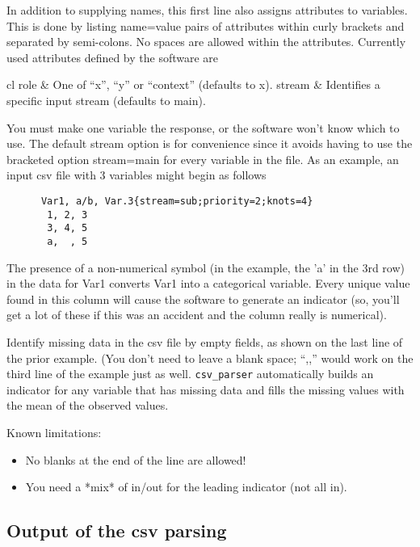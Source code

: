 \documentclass[12pt]{article}
\begin{document}
 In addition to supplying names, this first line also assigns attributes to
 variables.  This is done by listing name=value pairs of attributes within
 curly brackets and separated by semi-colons.  No spaces are allowed within the
 attributes.  Currently used attributes defined by the software are

 \begin{tabular}{cl}
   role   &  One of ``x'', ``y'' or ``context'' (defaults to x).     \cr
   stream &  Identifies a specific input stream  (defaults to main). \cr
 \end{tabular}

 \noindent
 You must make one variable the response, or the software won't know which to
 use.  The default stream option is for convenience since it avoids having to
 use the bracketed option {stream=main} for every variable in the file.
 As an example, an input csv file with 3 variables might begin as follows
 \begin{verbatim}
      Var1, a/b, Var.3{stream=sub;priority=2;knots=4}
       1, 2, 3
       3, 4, 5
       a,  , 5
 \end{verbatim}
 The presence of a non-numerical symbol (in the example, the 'a' in the 3rd row)
 in the data for Var1 converts Var1 into a categorical variable. Every unique
 value found in this column will cause the software to generate an indicator
 (so, you'll get a lot of these if this was an accident and the column really is
 numerical).

 Identify missing data in the csv file by empty fields, as shown on the last
 line of the prior example.  (You don't need to leave a blank space; ``,,''
 would work on the third line of the example just as well.  {\tt csv\_parser}
 automatically builds an indicator for any variable that has missing data and
 fills the missing values with the mean of the observed values.

 Known limitations:
 \begin{itemize}
   \item No blanks at the end of the line are allowed!
   \item  You need a *mix* of in/out for the leading indicator (not all in).
 \end{itemize}
   
\subsection*{Output of the csv parsing}
\end{document}
